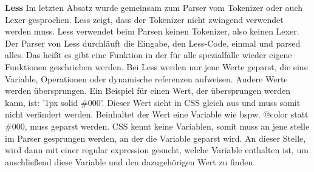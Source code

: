 \textbf{Less}\newline
Im letzten Absatz wurde gemeinsam zum Parser vom Tokenizer oder auch Lexer gesprochen. Less zeigt, dass der Tokenizer nicht zwingend verwendet werden muss.
Less verwendet beim Parsen keinen Tokenizer, also keinen Lexer.\newline
Der Parser von Less durchläuft die Eingabe, den Less-Code, einmal und parsed alles. Das heißt es gibt eine Funktion in der für alle spezialfälle wieder eigene Funktionen geschrieben werden.\newline
Bei Less werden nur jene Werte geparst, die eine Variable, Operationen oder dynamische referenzen aufweisen. Andere Werte werden übersprungen.\newline
Ein Beispiel für einen Wert, der übersprungen werden kann, ist: '1px solid \#000'.\newline
Dieser Wert sieht in CSS gleich aus und muss somit nicht verändert werden.\newline
Beinhaltet der Wert eine Variable wie bspw. @color statt \#000, muss geparst werden.\newline
CSS kennt keine Variablen, somit muss an jene stelle im Parser gesprungen werden, an der die Variable geparst wird.\newline
An dieser Stelle, wird dann mit einer regular expression gesucht, welche Variable enthalten ist, um anschließend diese Variable und den dazugehörigen Wert zu finden. 

